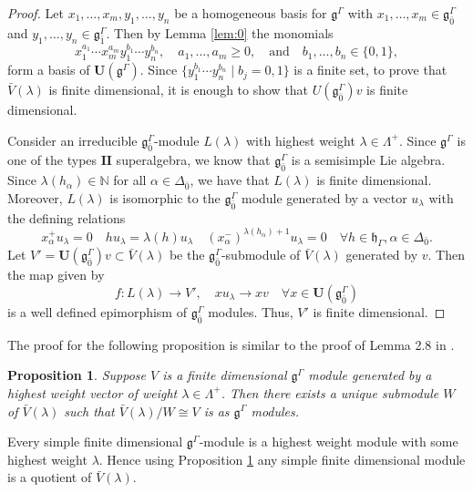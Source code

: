 \documentclass[11pt]{amsart}
\theoremstyle{plain}
\newtheorem{prop}[thm]{Proposition}
\theoremstyle{definition}
\newcommand{\g}{\mathfrak{g}}
\newcommand{\h}{\mathfrak{h}}
\begin{document}
 \begin{proof}
 Let $x_1, \ldots, x_m,y_1, \ldots, y_n$ be a homogeneous basis for $\g^{\Gamma}$ with $x_1, \ldots, x_m \in \g_{\bar0}^{\Gamma}$ and  $y_1, \ldots, y_n \in \g_{\bar1}^{\Gamma}$. Then by Lemma \ref{lem:0} the monomials
\[x_1^{a_1}\cdots x_m^{a_m} y_1^{b_1}\cdots y_n^{b_n}, \quad a_1, \ldots, a_m \geq 0, \quad \mbox{and}\quad b_1, \ldots, b_n \in \{0, 1\},\]
form a basis of $\mathbf{U}(\g^{\Gamma})$. Since $\{y_1^{b_1}\cdots y_n^{b_n} \mid b_j=0,1\}$ is a finite set, to prove that $\bar{V}(\lambda)$ is finite dimensional, it is enough to show that $U(\g_{\bar{0}}^{\Gamma})v$ is finite dimensional. 

Consider an irreducible $\g_{\bar{0}}^{\Gamma}$-module $L(\lambda)$ with highest weight $\lambda \in \Lambda^+$. Since $\g^{\Gamma}$ is one of the types $\textbf{II}$ superalgebra, we know that $\g_{\bar{0}}^{\Gamma}$ is a semisimple Lie algebra. Since $\lambda(h_\alpha) \in \mathbb{N}$ for all $\alpha \in \Delta_{\bar{0}}$, we have that $L(\lambda)$ is finite dimensional. Moreover, $L(\lambda)$ is isomorphic to the $\g_{\bar{0}}^{\Gamma}$ module generated by a vector $u_{\lambda}$ with the defining relations
     \begin{equation}
         x_{\alpha}^{+}u_\lambda=0 \quad hu_\lambda=\lambda(h)u_\lambda \quad (x_{\alpha}^{-})^{\lambda(h_\alpha)+1}u_\lambda=0 \quad \forall h\in \h_{\Gamma}, \alpha \in \Delta_{\bar{0}}.
     \end{equation}
     Let $V'=\mathbf{U}(\g_{\bar{0}}^{\Gamma})v \subset\bar{V}(\lambda)$ be the $\g_{\bar{0}}^{\Gamma}$-submodule of $\bar{V}(\lambda)$ generated by $v$. Then the map given by 
     \begin{equation}
         f:L(\lambda)\longrightarrow V', \quad xu_\lambda \longrightarrow xv \quad \forall x \in \mathbf{U}(\g_{\bar{0}}^{\Gamma})
     \end{equation}
     is a well defined epimorphism of $\g_{\bar{0}}^{\Gamma}$ modules. Thus, $V'$ is finite dimensional. 
 \end{proof}
 The proof for the following proposition is similar to the proof of Lemma 2.8 in \cite{CLS19}.
 \begin{prop}\label{prop:4'}
Suppose $V$ is a finite dimensional $\g^{\Gamma}$ module generated by a highest weight vector of weight $\lambda\in \Lambda^+$. Then there exists a unique submodule $W$ of $\bar{V}(\lambda)$ such that $\bar{V}(\lambda)/W\cong V$ is as $\g^{\Gamma}$ modules.
 \end{prop}
 Every simple finite dimensional $\g^{\Gamma}$-module is a highest weight module with some highest weight $\lambda$. Hence using Proposition \ref{prop:4'} any simple finite dimensional module is a quotient of $\bar{V}({\lambda}).$
\end{document}
